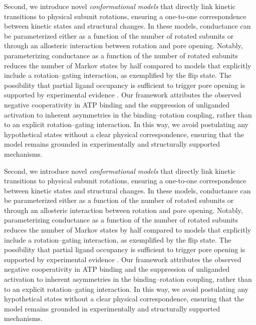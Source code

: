 \documentclass[pdflatex,sn-nature]{sn-jnl}%
\theoremstyle{thmstyleone}%
\theoremstyle{thmstyletwo}%
\theoremstyle{thmstylethree}%
\begin{document}
Second, we introduce novel \textit{conformational models} that directly link kinetic transitions to physical subunit rotations, ensuring a one-to-one correspondence between kinetic states and structural changes. In these models, conductance can be parameterized either as a function of the number of rotated subunits or through an allosteric interaction between rotation and pore opening. Notably, parameterizing conductance as a function of the number of rotated subunits reduces the number of Markov states by half compared to models that explicitly include a rotation–gating interaction, as exemplified by the flip state. The possibility that partial ligand occupancy is sufficient to trigger pore opening is supported by experimental evidence \cite{Stelmashenko2012ActivationOT}. Our framework attributes the observed negative cooperativity in ATP binding \cite{Sattler2020UnravellingTI} and the suppression of unliganded activation \cite{Stelmashenko2012ActivationOT} to inherent asymmetries in the binding–rotation coupling, rather than to an explicit rotation–gating interaction. In this way, we avoid postulating any hypothetical states without a clear physical correspondence, ensuring that the model remains grounded in experimentally and structurally supported mechanisms.

Second, we introduce novel \textit{conformational models} that directly link kinetic transitions to physical subunit rotations, ensuring a one-to-one correspondence between kinetic states and structural changes. In these models, conductance can be parameterized either as a function of the number of rotated subunits or through an allosteric interaction between rotation and pore opening. Notably, parameterizing conductance as a function of the number of rotated subunits reduces the number of Markov states by half compared to models that explicitly include a rotation–gating interaction, as exemplified by the flip state. The possibility that partial ligand occupancy is sufficient to trigger pore opening is supported by experimental evidence \cite{Stelmashenko2012ActivationOT}. Our framework attributes the observed negative cooperativity in ATP binding \cite{Sattler2020UnravellingTI} and the suppression of unliganded activation \cite{Stelmashenko2012ActivationOT} to inherent asymmetries in the binding–rotation coupling, rather than to an explicit rotation–gating interaction. In this way, we avoid postulating any hypothetical states without a clear physical correspondence, ensuring that the model remains grounded in experimentally and structurally supported mechanisms.
\end{document}
